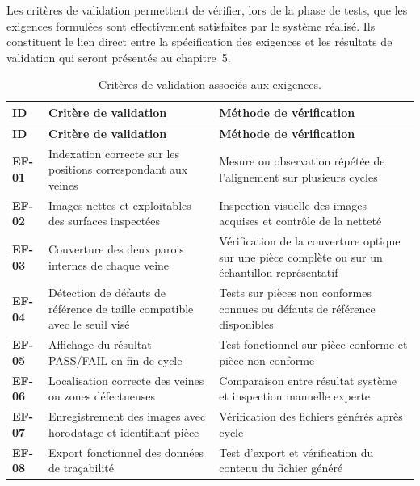 Les critères de validation permettent de vérifier, lors de la phase de tests, que les
exigences formulées sont effectivement satisfaites par le système réalisé. Ils constituent
le lien direct entre la spécification des exigences et les résultats de validation qui
seront présentés au chapitre~5.
\vspace{-0.5cm}
\renewcommand{\arraystretch}{1.3}
\small
\begin{longtable}{|p{1.3cm}|p{7cm}|p{7.2cm}|}
\caption{Critères de validation associés aux exigences.}
\label{tab:validation} \\
\hline
\rowcolor{navyblue}
\textbf{\color{white}ID} & \textbf{\color{white}Critère de validation} & \textbf{\color{white}Méthode de vérification} \\
\hline
\endfirsthead
\hline
\rowcolor{navyblue}
\textbf{\color{white}ID} & \textbf{\color{white}Critère de validation} & \textbf{\color{white}Méthode de vérification} \\
\hline
\endhead
\hline
\endfoot
\textbf{EF-01} & Indexation correcte sur les positions correspondant aux veines
    & Mesure ou observation répétée de l'alignement sur plusieurs cycles \\ \hline
\textbf{EF-02} & Images nettes et exploitables des surfaces inspectées
    & Inspection visuelle des images acquises et contrôle de la netteté \\ \hline
\textbf{EF-03} & Couverture des deux parois internes de chaque veine
    & Vérification de la couverture optique sur une pièce complète ou sur un échantillon représentatif \\ \hline
\textbf{EF-04} & Détection de défauts de référence de taille compatible avec le seuil visé
    & Tests sur pièces non conformes connues ou défauts de référence disponibles \\ \hline
\textbf{EF-05} & Affichage du résultat PASS/FAIL en fin de cycle
    & Test fonctionnel sur pièce conforme et pièce non conforme \\ \hline
\textbf{EF-06} & Localisation correcte des veines ou zones défectueuses
    & Comparaison entre résultat système et inspection manuelle experte \\ \hline
\textbf{EF-07} & Enregistrement des images avec horodatage et identifiant pièce
    & Vérification des fichiers générés après cycle \\ \hline
\textbf{EF-08} & Export fonctionnel des données de traçabilité
    & Test d'export et vérification du contenu du fichier généré \\ \hline

\end{longtable}
